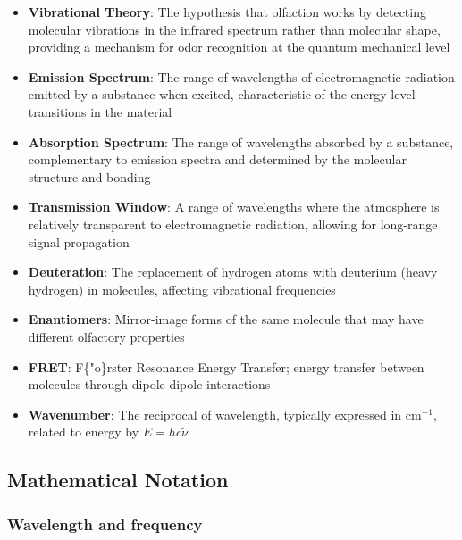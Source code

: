 \documentclass[
  13pt,
  a4paperpaper,
  12pt]{article}
\providecommand{\tightlist}{%
  \setlength{\itemsep}{0pt}\setlength{\parskip}{0pt}}
\begin{document}
\begin{itemize}
\tightlist
\item
  \textbf{Vibrational Theory}: The hypothesis that olfaction works by
  detecting molecular vibrations in the infrared spectrum rather than
  molecular shape, providing a mechanism for odor recognition at the
  quantum mechanical level
\item
  \textbf{Emission Spectrum}: The range of wavelengths of
  electromagnetic radiation emitted by a substance when excited,
  characteristic of the energy level transitions in the material
\item
  \textbf{Absorption Spectrum}: The range of wavelengths absorbed by a
  substance, complementary to emission spectra and determined by the
  molecular structure and bonding
\item
  \textbf{Transmission Window}: A range of wavelengths where the
  atmosphere is relatively transparent to electromagnetic radiation,
  allowing for long-range signal propagation
\item
  \textbf{Deuteration}: The replacement of hydrogen atoms with deuterium
  (heavy hydrogen) in molecules, affecting vibrational frequencies
\item
  \textbf{Enantiomers}: Mirror-image forms of the same molecule that may
  have different olfactory properties
\item
  \textbf{FRET}: F\{"o\}rster Resonance Energy Transfer; energy transfer
  between molecules through dipole-dipole interactions
\item
  \textbf{Wavenumber}: The reciprocal of wavelength, typically expressed
  in cm\(^{-1}\), related to energy by \(E = hc\tilde{\nu}\)
\end{itemize}

\subsection{Mathematical Notation}\label{mathematical-notation}

\subsubsection{Wavelength and frequency}\label{wavelength-and-frequency}
\end{document}
